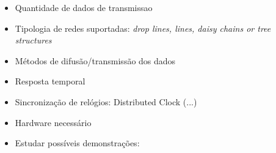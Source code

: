 % 
% 


\begin{itemize}
\item Quantidade de dados de transmissao
\item Tipologia de redes suportadas:
    \subitem \textit{drop lines, lines, daisy chains or tree structures}
\item Métodos de difusão/transmissão dos dados
\item Resposta temporal
\item Sincronização de relógios:
    \subitem Distributed Clock
    \subitem (...)
\item Hardware necessário
\item Estudar possíveis demonstrações:
\end{itemize}
